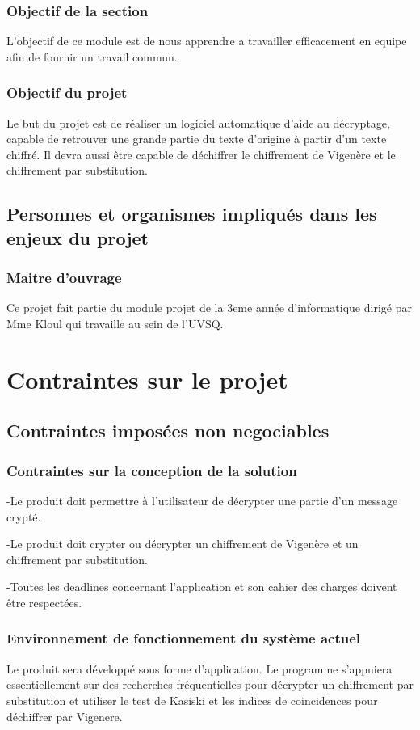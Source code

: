 \documentclass[a4]{article}
\begin{document}
			\subsubsection{Objectif de la section}
				L'objectif de ce module est de nous apprendre a travailler efficacement en equipe afin de fournir un travail commun.
			\subsubsection{Objectif du projet}
				Le but du projet est de réaliser un logiciel automatique d'aide au décryptage, capable de retrouver une grande partie du texte d'origine à partir d'un texte chiffré. Il devra aussi être capable de déchiffrer le chiffrement de Vigenère et le chiffrement par substitution.
		\subsection{Personnes et organismes impliqués dans les enjeux du projet} 
			\subsubsection{Maitre d'ouvrage}
				Ce projet fait partie du module projet de la 3eme année d'informatique dirigé par Mme Kloul qui travaille au sein de l'UVSQ.			
			
	\section{Contraintes sur le projet}
		\subsection{Contraintes imposées non negociables} 
			\subsubsection{Contraintes sur la conception de la solution}
				-Le produit doit permettre à l'utilisateur de décrypter une partie d'un message crypté.

				-Le produit doit crypter ou décrypter un chiffrement de Vigenère et un chiffrement par substitution.

				-Toutes les deadlines concernant l'application et son cahier des charges doivent être respectées.
			\subsubsection{Environnement de fonctionnement du système actuel}
				Le produit sera développé sous forme d'application. 
				Le programme s'appuiera essentiellement sur des recherches fréquentielles pour décrypter un chiffrement par substitution et utiliser le test de Kasiski et les indices de coincidences pour déchiffrer par Vigenere.
\end{document}
